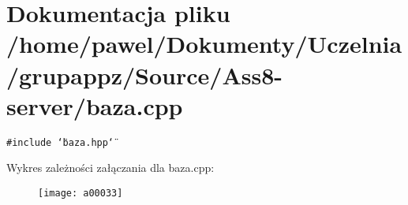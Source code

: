 \hypertarget{a00006}{
\section{Dokumentacja pliku /home/pawel/Dokumenty/Uczelnia/grupappz/Source/Ass8-server/baza.cpp}
\label{a00006}
}
{\tt \#include \char`\"{}baza.hpp\char`\"{}}\par


Wykres zależności załączania dla baza.cpp:\nopagebreak
\begin{figure}[H]
\begin{center}
\leavevmode
\texttt{[image: a00033]}
\end{center}
\end{figure}
